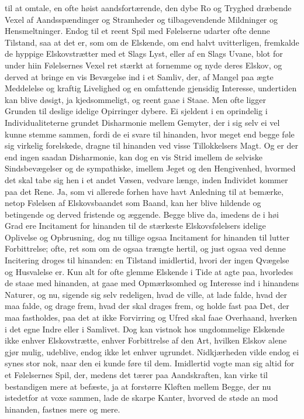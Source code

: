 \documentclass[12pt,a4paper]{book}
\newcommand{\apage}[1]{\marginnote{\footnotesize\textit{[#1]}}}
\begin{document}
til at omtale, en ofte høist aandsfortærende, den dybe Ro og Tryghed
dræbende Vexel af Aandsspændinger og Stramheder og tilbagevendende
Mildninger og Hensmeltninger. Endog til et reent Spil med Følelserne
udarter ofte denne Tilstand, saa at det er, som om de Elskende, om end
halvt uvitterligen, fremkalde de hyppige Elskovstrætter med et Slags
Lyst, eller af en Slags Uvane, blot for under hiin Følelsernes Vexel ret
stærkt at fornemme og nyde deres Elskov, og derved at bringe en vis
Bevægelse ind i et Samliv, der, af Mangel paa ægte Meddelelse og kraftig
Livelighed og en omfattende gjensidig Interesse, undertiden kan blive
døsigt, ja kjedsommeligt, og reent gaae i Staae. Men ofte ligger Grunden
til deslige idelige Opirringer dybere. Ei sjeldent i en oprindelig i
Individualiteterne grundet Disharmonie mellem Gemyter, der i sig selv ei
vel kunne stemme sammen, fordi de ei svare til hinanden, \apage{117} hvor meget end
begge føle sig virkelig forelskede, dragne til hinanden ved visse
Tillokkelsers Magt. Og er der end ingen saadan Disharmonie, kan dog en
vis Strid imellem de selviske Sindsbevægelser og de sympathiske, imellem
Jeget og den Hengivenhed, hvormed det skal tabe sig hen i et andet
Væsen, vedvare længe, inden Individet kommer paa det Rene. Ja, som vi
allerede forhen have havt Anledning til at bemærke, netop Følelsen af
Elskovsbaandet som Baand, kan her blive hildende og betingende og derved
fristende og æggende. Begge blive da, imedens de i høi Grad ere
Incitament for hinanden til de stærkeste Elskovsfølelsers idelige
Oplivelse og Opbrusning, dog nu tillige ogsaa Incitament for hinanden
til lutter Forbittrelse; ofte, ret som om de ogsaa trængte hertil, og
just ogsaa ved denne Incitering droges til hinanden: en Tilstand
imidlertid, hvori der ingen Qvægelse og Husvalelse er. Kun alt for ofte
glemme Elskende i Tide at agte paa, hvorledes de staae med hinanden, at
gaae med Opmærksomhed og Interesse ind i hinandens Naturer, og nu,
sigende sig selv redeligen, hvad de ville, at lade falde, hvad der maa
falde, og drage frem, hvad der skal drages frem, og holde fast paa Det,
der maa fastholdes, paa det at ikke Forvirring og Ufred skal faae
Overhaand, hverken i det egne Indre eller i Samlivet. Dog kan vistnok
hos ungdommelige Elskende ikke enhver Elskovstrætte, enhver Forbittrelse
af den Art, hvilken Elskov alene gjør mulig, udeblive, endog ikke let
\apage{118} enhver ugrundet. Nidkjærheden vilde endog ei synes stor nok, naar den ei
kunde føre til dem. Imidlertid vogte man sig altid for et Følelsernes
Spil, der, medens det tærer paa Aandskraften, kan virke til bestandigen
mere at befæste, ja at forstørre Kløften mellem Begge, der nu istedetfor
at voxe sammen, lade de skarpe Kanter, hvorved de støde an mod hinanden,
fastnes mere og mere.
\end{document}
